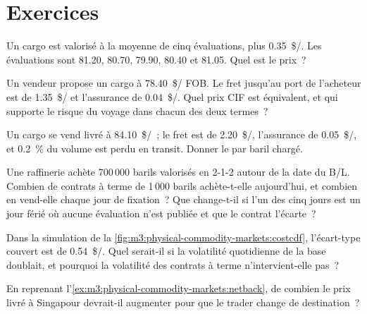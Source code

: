 \section{Exercices}

\begin{exercise}[$\star$]\label{exo:m3:physical-commodity-markets:1}
Un cargo est valorisé à la moyenne de cinq évaluations, plus \qty{0.35}{\$/\barrel}.
Les évaluations sont 81.20, 80.70, 79.90, 80.40 et 81.05. Quel est le prix~?
\end{exercise}

\begin{exercise}[$\star$]\label{exo:m3:physical-commodity-markets:2}
Un vendeur propose un cargo à \qty{78.40}{\$/\barrel} FOB. Le fret jusqu'au port de l'acheteur
est de \qty{1.35}{\$/\barrel} et l'assurance de \qty{0.04}{\$/\barrel}. Quel prix CIF est
équivalent, et qui supporte le risque du voyage dans chacun des deux termes~?
\end{exercise}

\begin{exercise}[$\star$]\label{exo:m3:physical-commodity-markets:3}
Un cargo se vend livré à \qty{84.10}{\$/\barrel}~; le fret est de
\qty{2.20}{\$/\barrel}, l'assurance de \qty{0.05}{\$/\barrel}, et 0.2~\% du volume
est perdu en transit. Donner le  par baril chargé.
\end{exercise}

\begin{exercise}[$\star\star$]\label{exo:m3:physical-commodity-markets:4}
Une raffinerie achète 700\,000 barils valorisés en 2-1-2 autour de la date du B/L. Combien de
contrats à terme de 1\,000 barils achète-t-elle aujourd'hui, et combien en vend-elle chaque
jour de fixation~? Que change-t-il si l'un des cinq jours est un jour férié où aucune évaluation
n'est publiée et que le contrat l'écarte~?
\end{exercise}

\begin{exercise}[$\star\star$]\label{exo:m3:physical-commodity-markets:5}
Dans la simulation de la \cref{fig:m3:physical-commodity-markets:costcdf}, l'écart-type couvert
est de \qty{0.54}{\$/\barrel}. Quel serait-il si la volatilité quotidienne de la base doublait,
et pourquoi la volatilité des contrats à terme n'intervient-elle pas~?
\end{exercise}

\begin{exercise}[$\star\star$]\label{exo:m3:physical-commodity-markets:6}
En reprenant l'\cref{ex:m3:physical-commodity-markets:netback}, de combien le prix livré à
Singapour devrait-il augmenter pour que le trader change de destination~?
\end{exercise}

